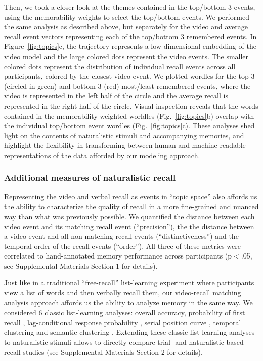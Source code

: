 \documentclass{article}
\begin{document}
{Then, we took a closer look at the themes contained in the top/bottom 3 events, using the memorability weights to select the top/bottom events. We performed the same analysis as described above, but separately for the video and average recall event vectors representing each of the top/bottom 3 remembered events. In Figure~\ref{fig:topics}c, the trajectory represents a low-dimensional embedding of the video model and the large colored dots represent the video events. The smaller colored dots represent the distribution of individual recall events across all participants, colored by the closest video event. We plotted wordles for the top 3 (circled in green) and bottom 3 (red) most/least remembered events, where the video is represented in the left half of the circle and the average recall is represented in the right half of the circle. Visual inspection reveals that the words contained in the memorability weighted worldles (Fig.~\ref{fig:topics}b) overlap with the individual top/bottom event wordles (Fig.~\ref{fig:topics}c). These analyses shed light on the contents of naturalistic stimuli and accompanying memories, and highlight the flexibility in transforming between human and machine readable representations of the data afforded by our modeling approach.

\subsubsection{Additional measures of naturalistic recall}
Representing the video and verbal recall as events in ``topic space'' also affords us the ability to characterize the quality of recall in a more fine-grained and nuanced way than what was previously possible. We quantified the distance between each video event and its matching recall event (``precision''), the the distance between a video event and all non-matching recall events (``distinctiveness'') and the temporal order of the recall events (``order''). All three of these metrics were correlated to hand-annotated memory performance across participants (p$<$.05, see Supplemental Materials Section 1 for details).

Just like in a traditional ``free-recall'' list-learning experiment where participants view a list of words and then verbally recall them, our video-recall matching analysis approach affords us the ability to analyze memory in the same way. We considered 6 classic list-learning analyses: overall accuracy, probability of first recall \citep{Hoga75, HowaKaha99; Lami99}, lag-conditional response probability \citep{Kaha96, HowaKaha99}, serial position curve \citep{Murd62a}, temporal clustering and semantic clustering \citep{HowaKaha02, PolyEtal09}. Extending these classic list-learning analyses to naturalistic stimuli allows to directly compare trial- and naturalistic-based recall studies (see Supplemental Materials Section 2 for details).

}
\end{document}
